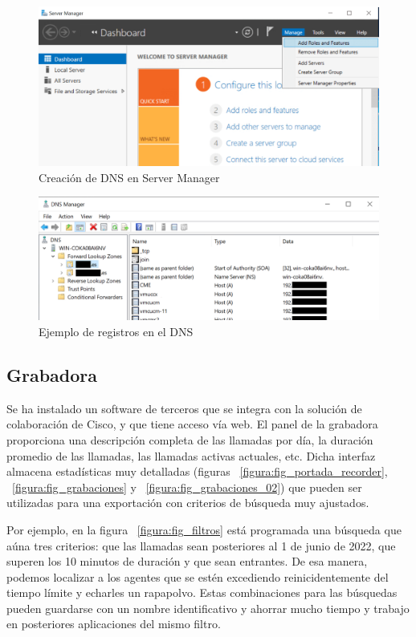 \documentclass[a4paper, 12pt]{book}
\begin{document}
\begin{figure}
  \centering
  \includegraphics[scale=0.85]{img/fig_dns}
  \caption{Creación de DNS en Server Manager}
  \label{figura:fig_dns}
\end{figure}

\begin{figure}
  \centering
  \includegraphics[scale=0.8]{img/fig_dominios}
  \caption{Ejemplo de registros en el DNS}
  \label{figura:fig_dominios}
\end{figure}

\subsection{Grabadora}
\label{sec:grabadora}
Se ha instalado un software de terceros que se integra con la solución de colaboración de Cisco, y que tiene acceso vía web. El panel de la grabadora proporciona una descripción completa de las llamadas por día, la duración promedio de las llamadas, las llamadas activas actuales, etc. Dicha interfaz almacena estadísticas muy detalladas (figuras ~\ref{figura:fig_portada_recorder}, ~\ref{figura:fig_grabaciones} y ~\ref{figura:fig_grabaciones_02}) que pueden ser utilizadas para una exportación con criterios de búsqueda muy ajustados.

Por ejemplo, en la figura ~\ref{figura:fig_filtros} está programada una búsqueda que aúna tres criterios: que las llamadas sean posteriores al 1 de junio de 2022, que superen los 10 minutos de duración y que sean entrantes.
De esa manera, podemos localizar a los agentes que se estén excediendo reinicidentemente del tiempo límite y echarles un rapapolvo.
Estas combinaciones para las búsquedas pueden guardarse con un nombre identificativo y ahorrar mucho tiempo y trabajo en posteriores aplicaciones del mismo filtro.
\end{document}
